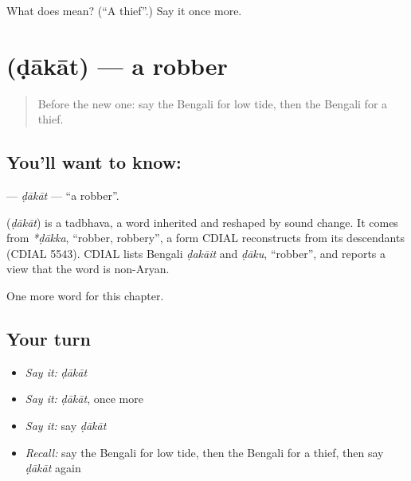 \begin{tcolorbox}[breakable,colback=teal!4,colframe=teal!35!black,title={Before you move on}]
What does  mean? (\textquotedblleft{}A thief\textquotedblright{}.) Say it once more.
\end{tcolorbox}
\section[\texorpdfstring{\bn{ডাকাত} (ḍākāt)}{ডাকাত (ḍākāt)}]{ (ḍākāt) — a robber}

\label{lesson:BN-C202-dakat}



\begin{quote}
Before the new one: say the Bengali for low tide, then the Bengali for a thief.
\end{quote}

\subsection*{You'll want to know: }
\textbf{} — \emph{ḍākāt} — \textquotedblleft{}a robber\textquotedblright{}.

\begin{cousinweb}
\textbf{} (\emph{ḍākāt}) is a tadbhava, a word inherited and reshaped by sound change. It comes from \emph{*ḍākka}, \textquotedblleft{}robber, robbery\textquotedblright{}, a form CDIAL reconstructs from its descendants (CDIAL 5543). CDIAL lists Bengali \emph{ḍakāit} and \emph{ḍāku}, \textquotedblleft{}robber\textquotedblright{}, and reports a view that the word is non-Aryan.
\end{cousinweb}

\begin{grammarlens}[title={What you've built}]
One more word for this chapter.
\end{grammarlens}

\subsection*{Your turn}
\begin{itemize}
\raggedright
  \item \emph{Say it:} \emph{ḍākāt}
  \item \emph{Say it:} \emph{ḍākāt}, once more
  \item \emph{Say it:} say \emph{ḍākāt}
  \item \emph{Recall:} say the Bengali for low tide, then the Bengali for a thief, then say \emph{ḍākāt} again
\end{itemize}

